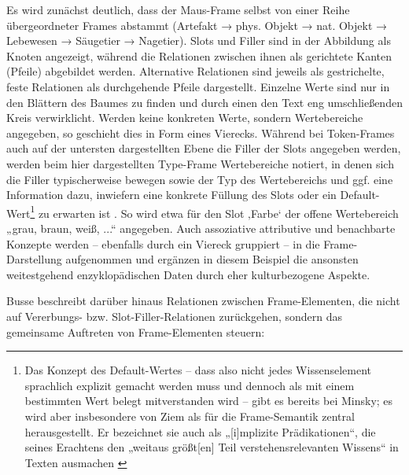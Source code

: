 Es wird zunächst deutlich, dass der Maus-Frame selbst von einer Reihe übergeordneter Frames abstammt (Artefakt → phys. Objekt → nat. Objekt → Lebewesen → Säugetier → Nagetier). Slots und Filler sind in der Abbildung als Knoten angezeigt, während die Relationen zwischen ihnen als gerichtete Kanten (Pfeile) abgebildet werden. Alternative Relationen sind jeweils als gestrichelte, feste Relationen als durchgehende Pfeile dargestellt. Einzelne Werte sind nur in den Blättern des Baumes zu finden und durch einen den Text eng umschließenden Kreis verwirklicht. Werden keine konkreten Werte, sondern Wertebereiche angegeben, so geschieht dies in Form eines Vierecks. Während bei Token-Frames auch auf der untersten dargestellten Ebene die Filler der Slots angegeben werden, werden beim hier dargestellten Type-Frame Wertebereiche notiert, in denen sich die Filler typischerweise bewegen sowie der Typ des Wertebereichs und ggf. eine Information dazu, inwiefern eine konkrete Füllung des Slots oder ein Default-Wert\footnote{Das Konzept des Default-Wertes -- dass also nicht jedes Wissenselement sprachlich explizit gemacht werden muss und dennoch als mit einem bestimmten Wert belegt mitverstanden wird -- gibt es bereits bei Minsky; es wird aber insbesondere von Ziem \autocite*{ziemFramesUndSprachliches2008} als für die Frame-Semantik zentral herausgestellt. Er bezeichnet sie auch als „{[}i{]}mplizite Prädikationen``, die seines Erachtens den „weitaus größt{[}en{]} Teil verstehensrelevanten Wissens`` in Texten ausmachen \autocite[335]{ziemFramesUndSprachliches2008}} zu erwarten ist \autocite[731-732]{busseFrameSemantikKompendium2012}. So wird etwa für den Slot ‚Farbe` der offene Wertebereich „grau, braun, weiß, ...`` angegeben. Auch assoziative attributive und benachbarte Konzepte werden -- ebenfalls durch ein Viereck gruppiert -- in die Frame-Darstellung aufgenommen und ergänzen in diesem Beispiel die ansonsten weitestgehend enzyklopädischen Daten durch eher kulturbezogene Aspekte.

Busse beschreibt darüber hinaus Relationen zwischen Frame-Elementen, die nicht auf Vererbungs- bzw. Slot-Filler-Relationen zurückgehen, sondern das gemeinsame Auftreten von Frame-Elementen steuern:

